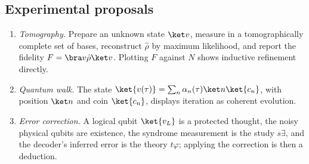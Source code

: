 \subsection{Experimental proposals}

\begin{enumerate}
  \item \emph{Tomography.} Prepare an unknown state $\ket v$, measure in a tomographically complete
        set of bases, reconstruct $\hat\rho$ by maximum likelihood, and report the fidelity
        $F=\bra v\hat\rho\ket v$. Plotting $F$ against $N$ shows inductive refinement directly.
  \item \emph{Quantum walk.} The state $\ket{v(\tau)}=\sum_n\alpha_n(\tau)\ket n\ket{c_n}$, with
        position $\ket n$ and coin $\ket{c_n}$, displays iteration as coherent evolution.
  \item \emph{Error correction.} A logical qubit $\ket{v_L}$ is a protected thought, the noisy
        physical qubits are existence, the syndrome measurement is the study $s\exists$, and the
        decoder's inferred error is the theory $t\varphi$; applying the correction is then a
        deduction.
\end{enumerate}
